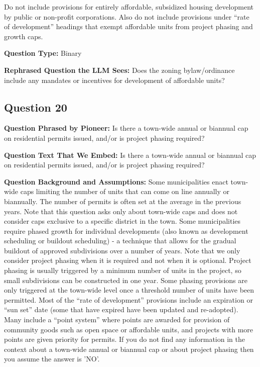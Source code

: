 Do not include provisions for entirely affordable, subsidized housing development by public or non-profit corporations. Also do not include provisions under “rate of development” headings that exempt affordable units from project phasing and growth caps.

\noindent\textbf{Question Type:} Binary

\noindent\textbf{Rephrased Question the LLM Sees:} Does the zoning bylaw/ordinance include any mandates or incentives for development of affordable units?

\vspace{1cm}
\subsection*{Question 20}
\noindent\textbf{Question Phrased by Pioneer:} Is there a town-wide annual or biannual cap on residential permits issued, and/or is project phasing required?

\noindent\textbf{Question Text That We Embed:} Is there a town-wide annual or biannual cap on residential permits issued, and/or is project phasing required?

\noindent\textbf{Question Background and Assumptions:} Some municipalities enact town-wide caps limiting the number of units that can come on line annually or biannually. The number of permits is often set at the average in the previous years. Note that this question asks only about town-wide caps and does not consider caps exclusive to a specific district in the town. Some municipalities require phased growth for individual developments (also known as development scheduling or buildout scheduling) - a technique that allows for the gradual buildout of approved subdivisions over a number of years. Note that we only consider project phasing when it is required and not when it is optional. Project phasing is usually triggered by a minimum number of units in the project, so small subdivisions can be constructed in one year. Some phasing provisions are only triggered at the town-wide level once a threshold number of units have been permitted. Most of the “rate of development” provisions include an expiration or “sun set” date (some that have expired have been updated and re-adopted). Many include a “point system” where points are awarded for provision of community goods such as open space or affordable units, and projects with more points are given priority for permits. If you do not find any information in the context about a town-wide annual or biannual cap or about project phasing then you assume the answer is 'NO'.

